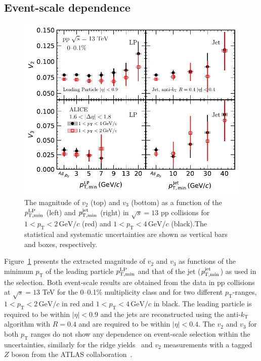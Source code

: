 \subsection{Event-scale dependence}
\begin{figure}[h!]
	\centering
	\includegraphics[width=0.99 \textwidth]{figures/Fig4_vn_LP.pdf}
	\caption{The magnitude of $v_2$ (top) and $v_3$ (bottom) as a function of the $\it{p}^{\rm{LP}}_{\rm{T,min}}$ (left) and $\it{p}^{\rm{jet}}_{\rm{T,min}}$ (right) in $\sqrt{s}=13$ pp collisions for $1<p_{\mathrm{T}}<2\,\mathrm{GeV}/c$ (red) and $1<p_{\mathrm{T}}<4\,\mathrm{GeV}/c$ (black).The statistical and systematic uncertainties are shown as vertical bars and boxes, respectively.}
	\label{fig:LPjet23}
\end{figure}    

Figure~\ref{fig:LPjet23} presents the extracted magnitude of $v_2$ and $v_3$ as functions of the minimum $p_\mathrm{T}$ of the leading particle $\it{p}^{\rm{LP}}_{\rm{T,min}}$ and that of the jet ($\it{p}^{\rm{jet}}_{\rm{T,min}}$) as used in the selection. 
Both event-scale results are obtained from the data in pp collisions at $\sqrt{s}= 13$ TeV for the 0--0.1\% multiplicity class and for two different $p_\mathrm{T}$-ranges, $1<p_{\mathrm{T}}<2\,\mathrm{GeV}/c$ in red and $1<p_{\mathrm{T}}<4\,\mathrm{GeV}/c$ in black. The leading particle is required to be within $|\eta|<0.9$ and the jets are reconstructed using the anti-$k_\mathrm{T}$ algorithm with $R=0.4$ and are required to be within $|\eta|<0.4$. The $v_2$ and $v_3$ for both $p_\mathrm{T}$ ranges do not show any dependence on event-scale selection within the uncertainties, similarly for the ridge yields~\cite{ALICE:2021nir} and $v_{2}$ measurements  with a tagged $Z$ boson from the ATLAS collaboration~\cite{Aaboud:2019mcw}. 

